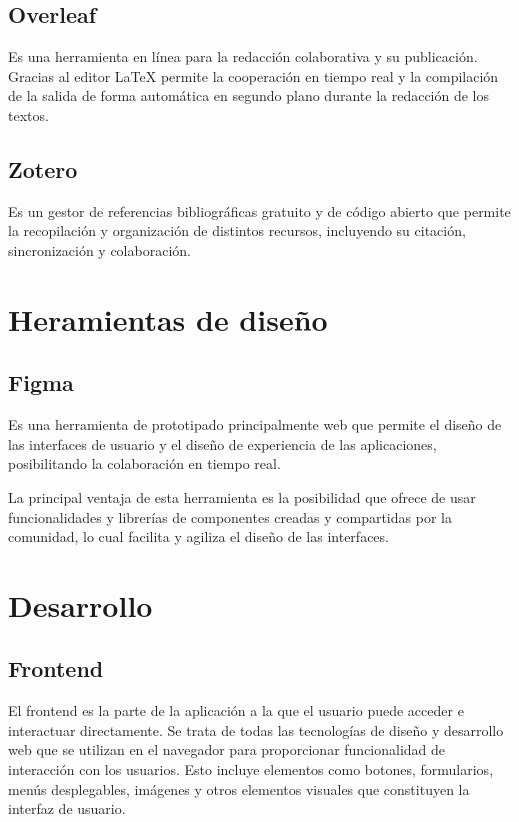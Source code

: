 \subsection{Overleaf}
\cite{Overleaf_bib} Es una herramienta en línea para la redacción colaborativa y su publicación. Gracias al editor LaTeX permite la cooperación en tiempo real y la compilación de la salida de forma automática en segundo plano durante la redacción de los textos.

\subsection{Zotero}
\cite{Zotero_bib} Es un gestor de referencias bibliográficas gratuito y de código abierto que permite la recopilación y organización de distintos recursos, incluyendo su citación, sincronización y colaboración. 

\section{Heramientas de diseño}
\subsection{Figma}
\cite{Figma1_bib} Es una herramienta de prototipado principalmente web que permite el diseño de las interfaces de usuario y el diseño de experiencia de las aplicaciones, posibilitando la colaboración en tiempo real.

\cite{Figma2_bib} La principal ventaja de esta herramienta es la posibilidad que ofrece de usar funcionalidades y librerías de componentes creadas y compartidas por la comunidad, lo cual facilita y agiliza el diseño de las interfaces.

\section{Desarrollo}

\subsection{Frontend}
\cite{frontendybackend} El frontend es la parte de la aplicación a la que el usuario puede acceder e interactuar directamente. Se trata de todas las tecnologías de diseño y desarrollo web que se utilizan en el navegador para proporcionar funcionalidad de interacción con los usuarios. Esto incluye elementos como botones, formularios, menús desplegables, imágenes y otros elementos visuales que constituyen la interfaz de usuario.

